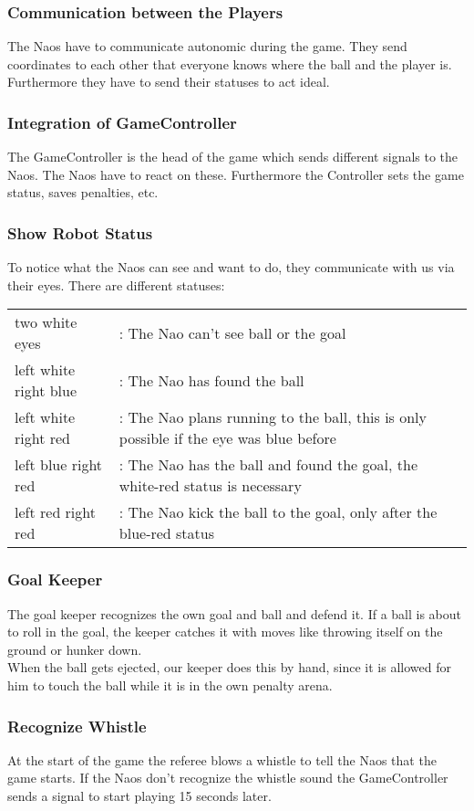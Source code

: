 \documentclass[12pt]{article}
\begin{document}
\subsubsection{Communication between the Players}
The Naos have to communicate autonomic during the game. They send coordinates to each other that everyone knows where the ball and the player is. Furthermore they have to send their statuses to act ideal. 
\subsubsection{Integration of GameController}
The GameController is the head of the game which sends different signals to the Naos. The Naos have to react on these. Furthermore the Controller sets the game status, saves penalties, etc.
\subsubsection{Show Robot Status}
To notice what the Naos can see and want to do, they communicate with us via their eyes.
There are different statuses:
\newline \newline
\begin{tabular}{l l}
two white eyes & : The Nao can't see ball or the goal\\
left white right blue & : The Nao has found the ball\\
left white right red & : The Nao plans running to the ball, this is only possible if the eye was blue before \\
left blue right red & : The Nao has the ball and found the goal, the white-red status is necessary \\
left red right red & : The Nao kick the ball to the goal, only after the blue-red status \\
\end{tabular}
\subsubsection{Goal Keeper}
The goal keeper recognizes the own goal and ball and defend it. If a ball is about to roll in the goal, the keeper catches it with moves like throwing itself on the ground or hunker down. \\
When the ball gets ejected, our keeper does this by hand, since it is allowed for him to touch the ball while it is in the own penalty arena.
\subsubsection{Recognize Whistle}
At the start of the game the referee blows a whistle to tell the Naos that the game starts. If the Naos don't recognize the whistle sound the GameController sends a signal to start playing 15 seconds later. 
\end{document}
